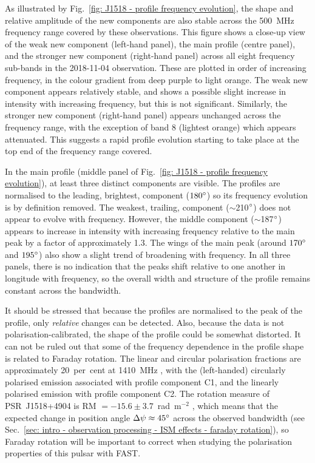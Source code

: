 As illustrated by Fig.~\ref{fig: J1518 - profile frequency evolution}, the shape and relative amplitude of the new components are also stable across the 500~MHz frequency range covered by these observations. This figure shows a close-up view of the weak new component (left-hand panel), the main profile (centre panel), and the stronger new component (right-hand panel) across all eight frequency sub-bands in the 2018-11-04 observation. These are plotted in order of increasing frequency, in the colour gradient from deep purple to light orange. The weak new component appears relatively stable, and shows a possible slight increase in intensity with increasing frequency, but this is not significant. Similarly, the stronger new component (right-hand panel) appears unchanged across the frequency range, with the exception of band 8 (lightest orange) which appears attenuated. This suggests a rapid profile evolution starting to take place at the top end of the frequency range covered.

In the main profile (middle panel of Fig.~\ref{fig: J1518 - profile frequency evolution}), at least three distinct components are visible. The profiles are normalised to the leading, brightest, component ($180^\circ$) so its frequency evolution is by definition removed. The weakest, trailing, component ($\sim$210$^\circ$) does not appear to evolve with frequency. However, the middle component ($\sim$187$^\circ$) appears to increase in intensity with increasing frequency relative to the main peak by a factor of approximately 1.3. The wings of the main peak (around $170^\circ$ and $195^\circ$) also show a slight trend of broadening with frequency. In all three panels, there is no indication that the peaks shift relative to one another in longitude with frequency, so the overall width and structure of the profile remains constant across the bandwidth. 

It should be stressed that because the profiles are normalised to the peak of the profile, only \textit{relative} changes can be detected. Also, because the data is not polarisation-calibrated, the shape of the profile could be somewhat distorted. It can not be ruled out that some of the frequency dependence in the profile shape is related to Faraday rotation. The linear and circular polarisation fractions are approximately 20~per~cent at 1410~MHz \citep{XKJ+1998}, with the (left-handed) circularly polarised emission associated with profile component C1, and the linearly polarised emission with profile component C2. The rotation measure of PSR~J1518+4904 is RM $= -15.6 \pm 3.7$~rad~m$^{-2}$ \citep{NPN+2020}, which means that the expected change in position angle $\Delta\psi \approx 45^\circ$ across the observed bandwidth (see Sec.~\ref{sec: intro - observation processing - ISM effects - faraday rotation}), so Faraday rotation will be important to correct when studying the polarisation properties of this pulsar with FAST.

